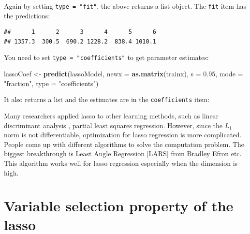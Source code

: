 \documentclass[12pt,]{krantz}
\makeatletter
\newenvironment{Shaded}{\begin{snugshade}}{\end{snugshade}}
\newcommand{\CommentTok}[1]{\textcolor[rgb]{0.37,0.37,0.37}{\textit{#1}}}
\newcommand{\DataTypeTok}[1]{\textcolor[rgb]{0.27,0.27,0.27}{#1}}
\newcommand{\FloatTok}[1]{\textcolor[rgb]{0.06,0.06,0.06}{#1}}
\newcommand{\KeywordTok}[1]{\textcolor[rgb]{0.27,0.27,0.27}{\textbf{#1}}}
\newcommand{\NormalTok}[1]{#1}
\newcommand{\OperatorTok}[1]{\textcolor[rgb]{0.43,0.43,0.43}{\textbf{#1}}}
\newcommand{\StringTok}[1]{\textcolor[rgb]{0.5,0.5,0.5}{#1}}
\newenvironment{kframe}{%
\medskip{}
\setlength{\fboxsep}{.8em}
 \def\at@end@of@kframe{}%
 \ifinner\ifhmode%
  \def\at@end@of@kframe{\end{minipage}}%
  \begin{minipage}{\columnwidth}%
 \fi\fi%
 \def\FrameCommand##1{\hskip\@totalleftmargin \hskip-\fboxsep
 \colorbox{shadecolor}{##1}\hskip-\fboxsep
     \hskip-\linewidth \hskip-\@totalleftmargin \hskip\columnwidth}%
 \MakeFramed {\advance\hsize-\width
   \@totalleftmargin\z@ \linewidth\hsize
   \@setminipage}}%
 {\par\unskip\endMakeFramed%
 \at@end@of@kframe}
\renewenvironment{Shaded}{\begin{kframe}}{\end{kframe}}
\makeatother
\begin{document}
Again by setting \texttt{type\ =\ "fit"}, the above returns a list object. The \texttt{fit} item has the predictions:

\begin{Shaded}
\end{Shaded}

\begin{verbatim}
##      1      2      3      4      5      6 
## 1357.3  300.5  690.2 1228.2  838.4 1010.1
\end{verbatim}

You need to set \texttt{type\ =\ "coefficients"} to get parameter estimates:

\begin{Shaded}
\begin{Highlighting}[]
\NormalTok{lassoCoef <-}\StringTok{ }\KeywordTok{predict}\NormalTok{(lassoModel, }\DataTypeTok{newx =} \KeywordTok{as.matrix}\NormalTok{(trainx), }\DataTypeTok{s =} \FloatTok{0.95}\NormalTok{, }\DataTypeTok{mode =} \StringTok{"fraction"}\NormalTok{, }\DataTypeTok{type =} \StringTok{"coefficients"}\NormalTok{)}
\end{Highlighting}
\end{Shaded}

It also returns a list and the estimates are in the \texttt{coefficients} item:

\begin{Shaded}
\end{Shaded}

Many researchers applied lasso to other learning methods, such as linear discriminant analysis \citep{Clem2011}, partial least squares regression\citep{chun2010}. However, since the \(L_1\) norm is not differentiable, optimization for lasso regression is more complicated. People come up with different algorithms to solve the computation problem. The biggest breakthrough is Least Angle Regression {[}LARS{]} from Bradley Efron etc. This algorithm works well for lasso regression especially when the dimension is high.

\hypertarget{variable-selection-property-of-the-lasso}{%
\section{Variable selection property of the lasso}\label{variable-selection-property-of-the-lasso}}
\end{document}
